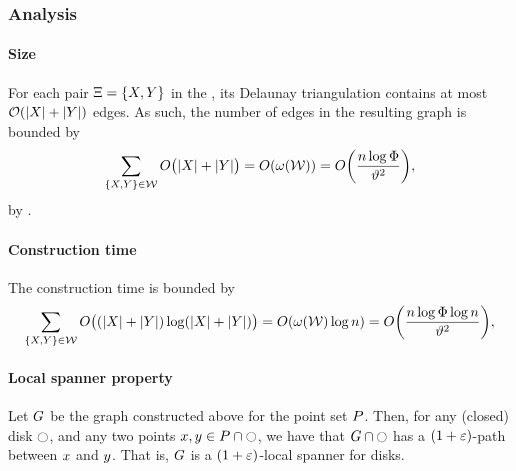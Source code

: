 \documentclass[12pt]{article}%
\begin{document}
\subsubsection{Analysis}

\paragraph{Size}

For each pair $\Xi = \{X, Y\}$ in the \WSPD, its Delaunay
triangulation contains at most $\mathcal{O}( |X| + |Y|)$ edges. As such,
the number of edges in the resulting graph is bounded by
\begin{equation*}
    \sum_{\{\PSX, \PSY\} \in \WS} O\bigl( |\PSX| + |\PSY| \bigr)
    =%
    O\pth{ \WeightX{\WS} }%
    =%
    O\pth{ \frac{n\log \spread}{{\epsA}^{2}}},
\end{equation*}
by .


\paragraph{Construction time}
The construction time is bounded by
\begin{equation*}
    \sum_{\{\PSX, \PSY\} \in \WS} O\bigl( (|\PSX| + |\PSY|) \log
    (|\PSX| + |\PSY|)  \bigr)
    =%
    O\pth{ \WeightX{\WS} \log n }%
    =%
    O\pth{ \frac{n\log \spread \log n}{{\epsA}^{2}}},
\end{equation*}

\paragraph{Local spanner property}

\begin{lemma}
    Let $G$ be the graph constructed above for the point set
    $P$. Then, for any (closed) disk $\ocircle$, and any two points
    $x, y \in P \cap \ocircle$, we have that
    $G \cap {\ocircle}$ has a $(1+\varepsilon)$-path between $x$ and
    $y$. That is, $G$ is a $(1+\varepsilon)$-local spanner for disks.
\end{lemma}
\end{document}
